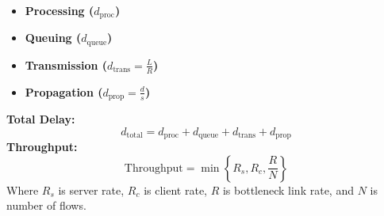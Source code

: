 \documentclass[9pt]{extarticle}
\begin{document}
\begin{multicols*}{3}
\begin{itemize}
\item \textbf{Processing (\( d_{\text{proc}} \))}
\item \textbf{Queuing (\( d_{\text{queue}} \))}
\item \textbf{Transmission (\( d_{\text{trans}} = \frac{L}{R} \))}
\item \textbf{Propagation (\( d_{\text{prop}} = \frac{d}{s} \))}
\end{itemize}
\textbf{Total Delay:}
\[
d_{\text{total}} = d_{\text{proc}} + d_{\text{queue}} + d_{\text{trans}} + d_{\text{prop}}
\]
\textbf{Throughput:}
\[
\text{Throughput} = \min\left\{ R_s, R_c, \dfrac{R}{N} \right\}
\]
Where \( R_s \) is server rate, \( R_c \) is client rate, \( R \) is bottleneck link rate, and \( N \) is number of flows.


\end{multicols*}
\end{document}

